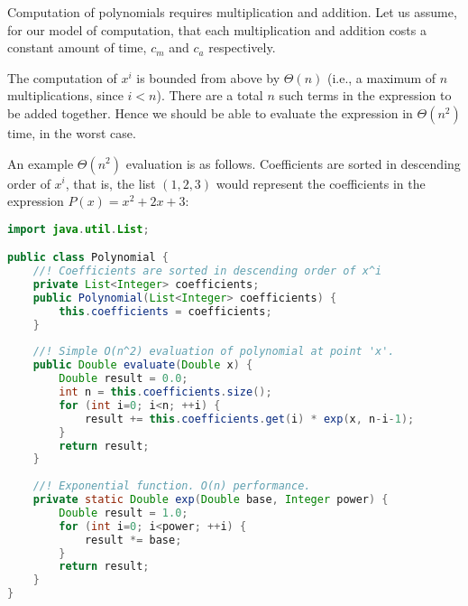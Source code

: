 \documentclass[a4paper,12pt]{article}
\begin{document}
\vspace{5mm}


\newpage
Computation of polynomials requires multiplication and addition. Let us assume, for our model of computation, that each multiplication and addition costs a constant amount of time, $c_m$ and $c_a$ respectively. 

The computation of $x^i$ is bounded from above by $\Theta(n)$  (i.e., a maximum of $n$ multiplications, since $i < n$). There are a total $n$ such terms in the expression to be added together. Hence we should
be able to evaluate the expression in $\Theta(n^2)$ time, in the worst case. 

An example $\Theta(n^2)$ evaluation is as follows. Coefficients are sorted in descending order of
$x^i$, that is, the list $(1, 2, 3)$ would represent the coefficients in the expression $P(x) = x^2 + 2x + 3$:

\begin{lstlisting}[language=Java]
import java.util.List;

public class Polynomial {
    //! Coefficients are sorted in descending order of x^i
    private List<Integer> coefficients;
    public Polynomial(List<Integer> coefficients) {
        this.coefficients = coefficients;
    }
    
    //! Simple O(n^2) evaluation of polynomial at point 'x'.
    public Double evaluate(Double x) {
        Double result = 0.0;
        int n = this.coefficients.size();
        for (int i=0; i<n; ++i) {
            result += this.coefficients.get(i) * exp(x, n-i-1);
        }
        return result;
    }
    
    //! Exponential function. O(n) performance.
    private static Double exp(Double base, Integer power) {
        Double result = 1.0;
        for (int i=0; i<power; ++i) {
            result *= base;
        }
        return result;
    }
}

\end{lstlisting}
\end{document}
